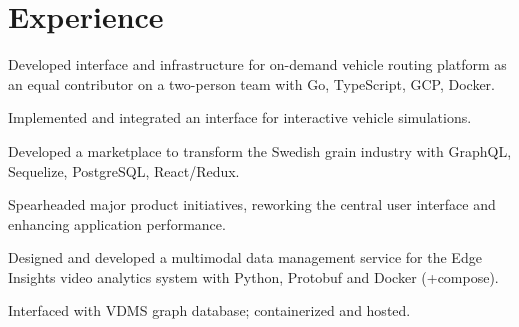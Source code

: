 \documentclass[letterpaper]{cv} %
\begin{document}
\begin{minipage}[t]{0.66\textwidth} %

  \section{Experience}

  \vspace{\topsep} %
  \begin{tightitemize}
    \item Developed interface and infrastructure for on-demand vehicle routing platform as an equal contributor on a two-person team with Go, TypeScript, GCP, Docker.
    \item Implemented and integrated an interface for interactive vehicle simulations. 
  \end{tightitemize}
  \sectionspace

  \begin{tightitemize}
    \item Developed a marketplace to transform the Swedish grain industry with GraphQL, Sequelize, PostgreSQL, React/Redux.
    \item Spearheaded major product initiatives, reworking the central user interface and enhancing application performance.
  \end{tightitemize}
  \sectionspace

  \begin{tightitemize}
    \item Designed and developed a multimodal data management service for the Edge Insights video analytics system with Python, Protobuf and Docker (+compose).
    \item Interfaced with VDMS graph database; containerized and hosted.
  \end{tightitemize}
  \sectionspace


\end{minipage}
\end{document}
